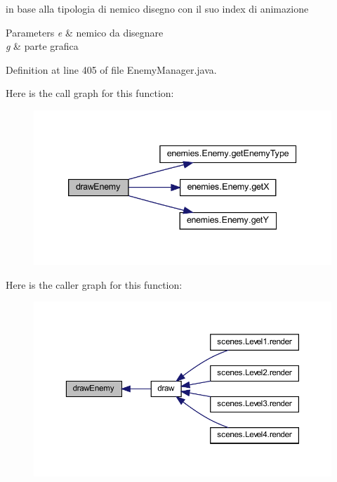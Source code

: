 in base alla tipologia di nemico disegno con il suo index di animazione 


\begin{DoxyParams}{Parameters}
{\em e} & nemico da disegnare \\
\hline
{\em g} & parte grafica \\
\hline
\end{DoxyParams}


Definition at line 405 of file Enemy\+Manager.\+java.

Here is the call graph for this function\+:\nopagebreak
\begin{figure}[H]
\begin{center}
\leavevmode
\includegraphics[width=339pt]{classmanagers_1_1_enemy_manager_a7ebdd9acefa4682b23b1ad2c0be558f4_cgraph}
\end{center}
\end{figure}
Here is the caller graph for this function\+:\nopagebreak
\begin{figure}[H]
\begin{center}
\leavevmode
\includegraphics[width=350pt]{classmanagers_1_1_enemy_manager_a7ebdd9acefa4682b23b1ad2c0be558f4_icgraph}
\end{center}
\end{figure}
\mbox{\label{classmanagers_1_1_enemy_manager_a9c98cd29298e5f583c52dc46a6d70d46}} 
